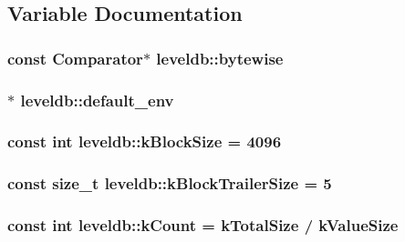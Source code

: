 \subsection{Variable Documentation}
\hypertarget{namespaceleveldb_abacb49d42ee3c64ccbc0ce22391816d4}{
\subsubsection[{bytewise}]{\setlength{\rightskip}{0pt plus 5cm}const {\bf Comparator}$\ast$ leveldb\-::bytewise\hspace{0.3cm}{\ttfamily [static]}}}\label{namespaceleveldb_abacb49d42ee3c64ccbc0ce22391816d4}
\hypertarget{namespaceleveldb_a9ade93809ff59d5e6da0adc55c326a84}{
\subsubsection[{default\-\_\-env}]{$\ast$ leveldb\-::default\-\_\-env\hspace{0.3cm}{\ttfamily [static]}}}\label{namespaceleveldb_a9ade93809ff59d5e6da0adc55c326a84}
\hypertarget{namespaceleveldb_a6fb0b0eafa487f7c4940d210c77cece6}{
\subsubsection[{k\-Block\-Size}]{\setlength{\rightskip}{0pt plus 5cm}const int leveldb\-::k\-Block\-Size = 4096\hspace{0.3cm}{\ttfamily [static]}}}\label{namespaceleveldb_a6fb0b0eafa487f7c4940d210c77cece6}
\hypertarget{namespaceleveldb_a4f00b102aae97cb0b0418b6f703a577e}{
\subsubsection[{k\-Block\-Trailer\-Size}]{\setlength{\rightskip}{0pt plus 5cm}const size\-\_\-t leveldb\-::k\-Block\-Trailer\-Size = 5\hspace{0.3cm}{\ttfamily [static]}}}\label{namespaceleveldb_a4f00b102aae97cb0b0418b6f703a577e}
\hypertarget{namespaceleveldb_a9bd5c84d01be4af58d509c6aafc20d85}{
\subsubsection[{k\-Count}]{\setlength{\rightskip}{0pt plus 5cm}const int leveldb\-::k\-Count = {\bf k\-Total\-Size} / {\bf k\-Value\-Size}\hspace{0.3cm}{\ttfamily [static]}}}\label{namespaceleveldb_a9bd5c84d01be4af58d509c6aafc20d85}
